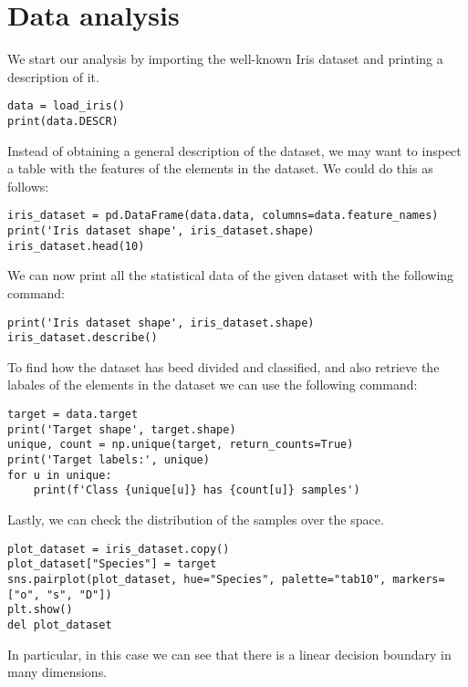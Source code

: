 \section{Data analysis}

We start our analysis by importing the well-known Iris dataset and printing a description of it. 
\begin{lstlisting}[style=Python]
data = load_iris()
print(data.DESCR)
\end{lstlisting}
Instead of obtaining a general description of the dataset, we may want to inspect a table with the features of the elements in the dataset.
We could do this as follows: 
\begin{lstlisting}[style=Python]
iris_dataset = pd.DataFrame(data.data, columns=data.feature_names)
print('Iris dataset shape', iris_dataset.shape)
iris_dataset.head(10)
\end{lstlisting}
We can now print all the statistical data of the given dataset with the following command: 
\begin{lstlisting}[style=Python]
print('Iris dataset shape', iris_dataset.shape)
iris_dataset.describe()
\end{lstlisting}
To find how the dataset has beed divided and classified, and also retrieve the labales of the elements in the dataset we can use the following command: 
\begin{lstlisting}[style=Python]
target = data.target
print('Target shape', target.shape)
unique, count = np.unique(target, return_counts=True)
print('Target labels:', unique)
for u in unique:
    print(f'Class {unique[u]} has {count[u]} samples')
\end{lstlisting}
Lastly, we can check the distribution of the samples over the space. 
\begin{lstlisting}[style=Python]
plot_dataset = iris_dataset.copy()
plot_dataset["Species"] = target
sns.pairplot(plot_dataset, hue="Species", palette="tab10", markers=["o", "s", "D"])
plt.show()
del plot_dataset
\end{lstlisting}
In particular, in this case we can see that there is a linear decision boundary in many dimensions. 